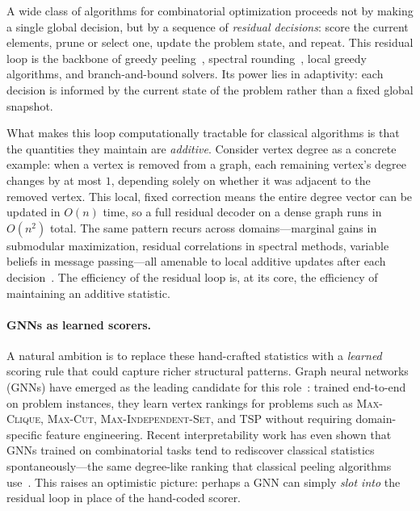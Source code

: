 \documentclass[11pt]{article}
\theoremstyle{plain}
\theoremstyle{definition}
\theoremstyle{remark}
\begin{document}
A wide class of algorithms for combinatorial optimization proceeds not by making a
single global decision, but by a sequence of \emph{residual decisions}: score the
current elements, prune or select one, update the problem state, and repeat. This
residual loop is the backbone of greedy peeling~\citep{feige2010}, spectral
rounding~\citep{alon1998}, local greedy algorithms, and branch-and-bound solvers. Its power lies in
adaptivity: each decision is informed by the current state of the problem rather than
a fixed global snapshot.

What makes this loop computationally tractable for classical algorithms is that the
quantities they maintain are \emph{additive}. Consider vertex degree as a concrete
example: when a vertex is removed from a graph, each remaining vertex's degree changes
by at most $1$, depending solely on whether it was adjacent to the removed vertex.
This local, fixed correction means the entire degree vector can be updated in $O(n)$
time, so a full residual decoder on a dense graph runs in $O(n^2)$ total. The same
pattern recurs across domains---marginal gains in submodular maximization, residual
correlations in spectral methods, variable beliefs in message passing---all amenable
to local additive updates after each decision~\citep{feige2010, dekel2014}. The
efficiency of the residual loop is, at its core, the efficiency of maintaining an
additive statistic.

\paragraph{GNNs as learned scorers.}
A natural ambition is to replace these hand-crafted statistics with a \emph{learned}
scoring rule that could capture richer structural patterns. Graph neural networks
(GNNs) have emerged as the leading candidate for this
role~\citep{karalias2020, min2022, garmendia2024}: trained end-to-end on problem
instances, they learn vertex rankings for problems such as \textsc{Max-Clique},
\textsc{Max-Cut}, \textsc{Max-Independent-Set}, and \textsc{TSP} without requiring
domain-specific feature engineering. Recent interpretability work has even shown that
GNNs trained on combinatorial tasks tend to rediscover classical statistics
spontaneously---the same degree-like ranking that classical peeling algorithms
use~\citep{shoham2026ltr, cappart2023}. This raises an optimistic picture: perhaps a
GNN can simply \emph{slot into} the residual loop in place of the hand-coded scorer.
\end{document}
